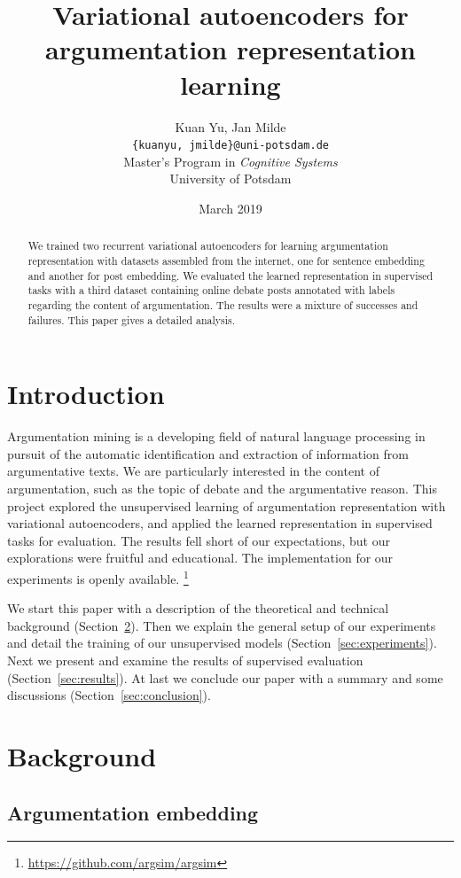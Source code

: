 \documentclass[11pt]{article}
\title{Variational autoencoders for argumentation representation learning}
\author{%
  Kuan Yu, Jan Milde\\
  \texttt{\{kuanyu, jmilde\}@uni-potsdam.de}\\
  Master's Program in \emph{Cognitive Systems}\\
  University of Potsdam}
\date{March 2019}
\begin{document}
\maketitle

\begin{abstract}
  We trained two recurrent variational autoencoders for learning argumentation representation
  with datasets assembled from the internet,
  one for sentence embedding and another for post embedding.
  We evaluated the learned representation in supervised tasks
  with a third dataset containing online debate posts annotated with labels
  regarding the content of argumentation.
  The results were a mixture of successes and failures.
  This paper gives a detailed analysis.
\end{abstract}

\section{Introduction}\label{sec:introduction}

Argumentation mining is a developing field of natural language processing
in pursuit of the automatic identification and extraction of information from argumentative texts.
We are particularly interested in the content of argumentation,
such as the topic of debate and the argumentative reason.
This project explored the unsupervised learning of argumentation representation with variational autoencoders,
and applied the learned representation in supervised tasks for evaluation.
The results fell short of our expectations,
but our explorations were fruitful and educational.
The implementation for our experiments is openly available.%
\footnote{\url{https://github.com/argsim/argsim}}

We start this paper with a description of the theoretical and technical background
(Section~\ref{sec:background}).
Then we explain the general setup of our experiments and detail the training of our unsupervised models
(Section~\ref{sec:experiments}).
Next we present and examine the results of supervised evaluation
(Section~\ref{sec:results}).
At last we conclude our paper with a summary and some discussions (Section~\ref{sec:conclusion}).

\section{Background}\label{sec:background}

\subsection{Argumentation embedding}\label{sec:argum-simil}
\end{document}
